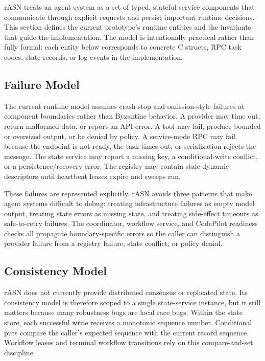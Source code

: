 \documentclass[manuscript,screen,review]{acmart}
\newcommand{\rasn}{rASN\xspace}
\newcommand{\cpp}{C\nolinebreak\hspace{-.05em}\raisebox{.4ex}{\tiny\bf ++}\xspace}
\begin{document}
\rasn treats an agent system as a set of typed, stateful service components that
communicate through explicit requests and persist important runtime decisions.
This section defines the current prototype's runtime entities and the invariants
that guide the implementation. The model is intentionally practical rather than
fully formal: each entity below corresponds to concrete \cpp structs, RPC task
codes, state records, or log events in the implementation.

\subsection{Failure Model}

The current runtime model assumes crash-stop and omission-style failures at
component boundaries rather than Byzantine behavior. A provider may time out,
return malformed data, or report an API error. A tool may fail, produce bounded
or oversized output, or be denied by policy. A service-mode RPC may fail because
the endpoint is not ready, the task times out, or serialization rejects the
message. The state service may report a missing key, a conditional-write
conflict, or a persistence/recovery error. The registry may contain stale dynamic
descriptors until heartbeat leases expire and sweeps run.

These failures are represented explicitly. \rasn avoids three patterns that make
agent systems difficult to debug: treating infrastructure failures as empty
model output, treating state errors as missing state, and treating side-effect
timeouts as safe-to-retry failures. The coordinator, workflow service, and
CodePilot readiness checks all propagate boundary-specific errors so the caller
can distinguish a provider failure from a registry failure, state conflict, or
policy denial.

\subsection{Consistency Model}

\rasn does not currently provide distributed consensus or replicated state. Its
consistency model is therefore scoped to a single state-service instance, but it
still matters because many robustness bugs are local race bugs. Within the state
store, each successful write receives a monotonic sequence number. Conditional
puts compare the caller's expected sequence with the current record sequence.
Workflow leases and terminal workflow transitions rely on this compare-and-set
discipline.
\end{document}
